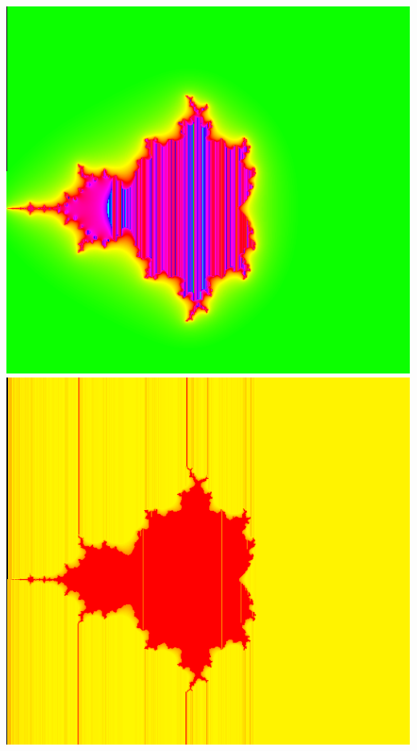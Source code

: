 \documentclass[../resume.tex]{subfiles}
\begin{document}
\includegraphics[scale=0.15]{../TAing/mandel/3.png}
\includegraphics[scale=0.15]{../TAing/mandel/4.png}
\end{document}

